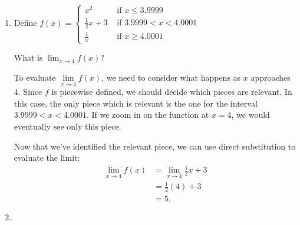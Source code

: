 \documentclass{article}
\begin{document}
\begin{enumerate}[resume]
\item 


  \begin{problem}[\vfill]
    Define
    $\displaystyle f(x) =
      \begin{cases} 
        x^2 & \text{ if } x \leq 3.9999 \\
        \frac{1}{2} x + 3 & \text{ if } 3.9999 < x < 4.0001 \\
        \frac{1}{x} & \text{ if } x \geq 4.0001    
      \end{cases}$

    What is $\displaystyle \lim_{x \to 4} f(x)$?
  \end{problem}

  \begin{solution}
    To evaluate $\lim\limits_{x \to 4} f(x)$, we need to consider what happens as $x$ approaches $4$.
    Since $f$ is piecewise defined, we should decide which pieces are relevant. In this case,
    the only piece which is relevant is the one for the interval $3.9999 < x < 4.0001$. If we
    zoom in on the function at $x=4$, we would eventually see only this piece.

    Now that we've identified the relevant piece, we can use direct substitution to evaluate the limit:
    \begin{align*}
      \lim_{x \to 4} f(x) &= \lim_{x \to 4} \tfrac{1}{2} x + 3 \\
      &= \tfrac{1}{2}(4) + 3 \\
      &= 5.
    \end{align*}
  \end{solution}

\item 



\end{enumerate}
\end{document}
